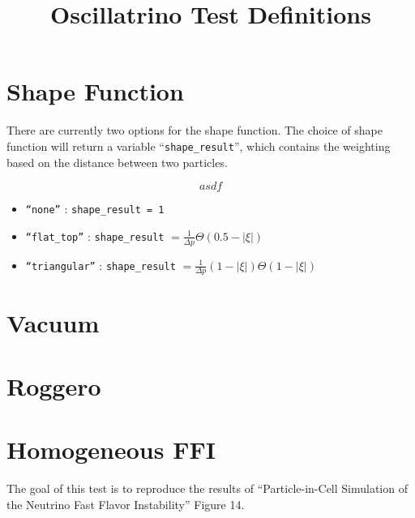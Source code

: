 \documentclass{article}
\title{Oscillatrino Test Definitions}
\begin{document}
\section{Shape Function}

There are currently two options for the shape function. The choice of shape function will return a variable ``{\tt shape\_result}'', which contains the weighting based on the distance between two particles.

\begin{equation}
  asdf
\end{equation}

\begin{itemize}
  \item {\tt ``none''} : {\tt shape\_result = 1}
  \item {\tt ``flat\_top''} : {\tt shape\_result} $= \frac{1}{\Delta p} \Theta(0.5-|\xi|)$
    \item {\tt ``triangular''} : {\tt shape\_result} $= \frac{1}{\Delta p} (1-|\xi|)\Theta(1-|\xi|)$
\end{itemize}

\section{Vacuum}

\section{Roggero}

\section{Homogeneous FFI}
The goal of this test is to reproduce the results of ``Particle-in-Cell Simulation of the Neutrino Fast Flavor Instability'' Figure 14.
\end{document}

